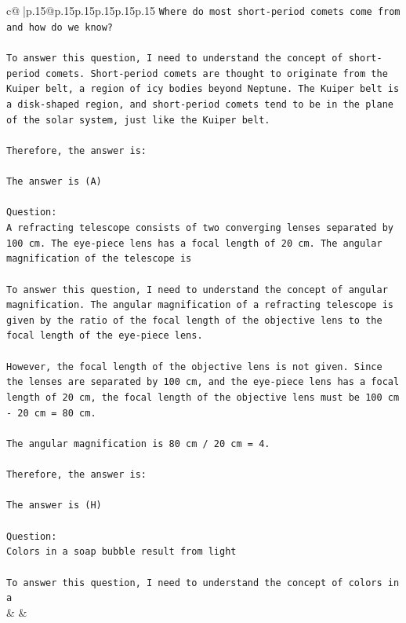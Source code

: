\documentclass{article}
\begin{document}
{\begin{supertabular}{c@{$\;$}|p{.15\linewidth}@{}p{.15\linewidth}p{.15\linewidth}p{.15\linewidth}p{.15\linewidth}p{.15\linewidth}}
{{{\texttt{Where do most short{-}period comets come from and how do we know?} \\
\\ 
\texttt{To answer this question, I need to understand the concept of short{-}period comets. Short{-}period comets are thought to originate from the Kuiper belt, a region of icy bodies beyond Neptune. The Kuiper belt is a disk{-}shaped region, and short{-}period comets tend to be in the plane of the solar system, just like the Kuiper belt.} \\
\\ 
\texttt{Therefore, the answer is:} \\
\\ 
\texttt{The answer is (A)} \\
\\ 
\texttt{Question:} \\
\texttt{A refracting telescope consists of two converging lenses separated by 100 cm. The eye{-}piece lens has a focal length of 20 cm. The angular magnification of the telescope is} \\
\\ 
\texttt{To answer this question, I need to understand the concept of angular magnification. The angular magnification of a refracting telescope is given by the ratio of the focal length of the objective lens to the focal length of the eye{-}piece lens.} \\
\\ 
\texttt{However, the focal length of the objective lens is not given. Since the lenses are separated by 100 cm, and the eye{-}piece lens has a focal length of 20 cm, the focal length of the objective lens must be 100 cm {-} 20 cm = 80 cm.} \\
\\ 
\texttt{The angular magnification is 80 cm / 20 cm = 4.} \\
\\ 
\texttt{Therefore, the answer is:} \\
\\ 
\texttt{The answer is (H)} \\
\\ 
\texttt{Question:} \\
\texttt{Colors in a soap bubble result from light} \\
\\ 
\texttt{To answer this question, I need to understand the concept of colors in a} \\
            }
        }
    }
    & & \\ \\


\end{supertabular}}
\end{document}
